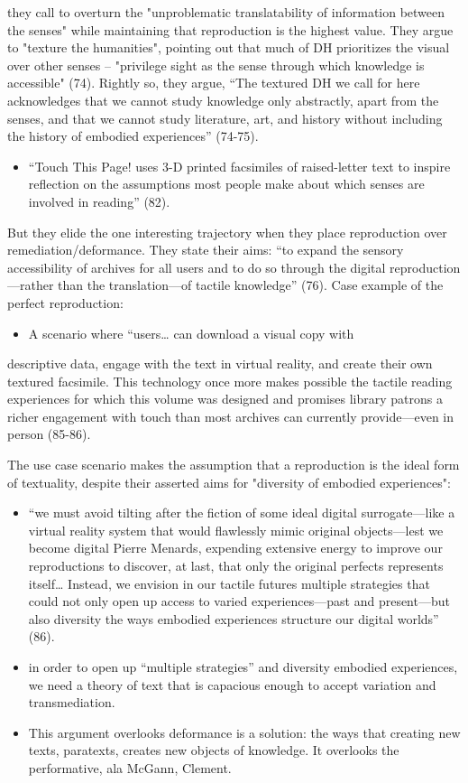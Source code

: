 \documentclass[11pt]{article}
\begin{document}
they call to overturn the "unproblematic translatability of
information between the senses" while maintaining that reproduction is
the highest value. They argue to "texture the humanities", pointing
out that much of DH prioritizes the visual over other senses --
"privilege sight as the sense through which knowledge is accessible"
(74). Rightly so, they argue, “The textured DH we call for here
acknowledges that we cannot study knowledge only abstractly, apart
from the senses, and that we cannot study literature, art, and history
without including the history of embodied experiences” (74-75).
\begin{itemize}
\item “Touch This Page! uses 3-D printed facsimiles of raised-letter text
to inspire reflection on the assumptions most people make about
which senses are involved in reading” (82).
\end{itemize}

But they elide the one interesting trajectory when they place
reproduction over remediation/deformance. They state their aims: “to
expand the sensory accessibility of archives for all users and to do
so through the digital reproduction---rather than the translation---of
tactile knowledge” (76). Case example of the perfect reproduction:
\begin{itemize}
\item A scenario where “users\ldots{} can download a visual copy with
\end{itemize}
descriptive data, engage with the text in virtual reality, and create
their own textured facsimile. This technology once more makes possible
the tactile reading experiences for which this volume was designed and
promises library patrons a richer engagement with touch than most
archives can currently provide---even in person (85-86). 

The use case scenario makes the assumption that a reproduction is the
ideal form of textuality, despite their asserted aims for "diversity
of embodied experiences":
\begin{itemize}
\item “we must avoid tilting after the fiction of some ideal digital
surrogate---like a virtual reality system that would flawlessly
mimic original objects---lest we become digital Pierre Menards,
expending extensive energy to improve our reproductions to discover,
at last, that only the original perfects represents itself… Instead,
we envision in our tactile futures multiple strategies that could
not only open up access to varied experiences---past and
present---but also diversity the ways embodied experiences structure
our digital worlds” (86).
\item in order to open up “multiple strategies” and diversity embodied
experiences, we need a theory of text that is capacious enough to
accept variation and transmediation.
\item This argument overlooks deformance is a solution: the ways that
creating new texts, paratexts, creates new objects of knowledge. It
overlooks the performative, ala McGann, Clement.
\end{itemize}
\end{document}
